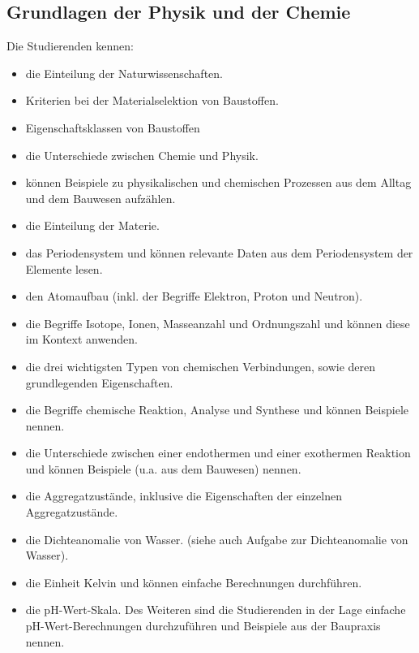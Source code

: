 \subsection*{Grundlagen der Physik und der Chemie}

Die Studierenden kennen: 

\begin{itemize}[noitemsep]
	\item die Einteilung der Naturwissenschaften.
	\item Kriterien bei der Materialselektion von Baustoffen.
	\item Eigenschaftsklassen von Baustoffen
	\item die Unterschiede zwischen Chemie und Physik.
	\item  können Beispiele zu physikalischen und chemischen Prozessen aus dem Alltag und dem Bauwesen aufzählen.
	\item die Einteilung der Materie.
	\item das Periodensystem und können relevante Daten aus dem Periodensystem der Elemente lesen.
	\item den Atomaufbau (inkl. der Begriffe Elektron, Proton und Neutron). 
	\item die Begriffe Isotope, Ionen, Masseanzahl und Ordnungszahl und können diese im Kontext anwenden.
	\item die drei wichtigsten Typen von chemischen Verbindungen, sowie deren grundlegenden Eigenschaften.
	\item die Begriffe chemische Reaktion, Analyse und Synthese und können Beispiele nennen.
	\item die Unterschiede zwischen einer endothermen und einer exothermen Reaktion und können Beispiele (u.a. aus dem Bauwesen) nennen.
	\item die Aggregatzustände, inklusive die Eigenschaften der einzelnen Aggregatzustände.
	\item die Dichteanomalie von Wasser. (siehe auch Aufgabe zur Dichteanomalie von Wasser).
	\item die Einheit Kelvin und können einfache Berechnungen durchführen.
	\item die pH-Wert-Skala. Des Weiteren sind die Studierenden in der Lage einfache pH-Wert-Be\-rechnungen durchzuführen und Beispiele aus der Baupraxis nennen.

\end{itemize}
